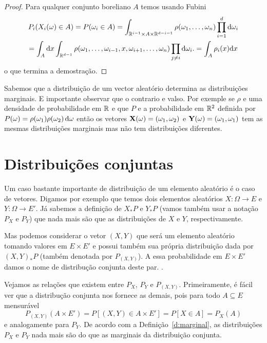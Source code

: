 \begin{proof}
 Para qualquer conjunto boreliano $A$ temos usando Fubini
 \begin{multline*}
  P_i(X_i(\omega)\in A)=P(\omega_i\in A)= \int_{{\mathbb R}^{i-1}\times A \times {\ensuremath{\mathbb R}}^{d-i-1}}
  \rho(\omega_1,\dots,\omega_n)\prod_{i=1}^d \mathrm{d} \omega_i
  \\ =\int_A  \mathrm{d} x \int_{{\mathbb R}^{d-1}}\rho(\omega_1,\dots ,\omega_{i-1},x,\omega_{i+1},\dots,\omega_n)\prod_{j\ne i} \mathrm{d} \omega_i.
  =\int_A\rho_i(x)\mathrm{d} x
 \end{multline*}
o que termina a demostração.
\end{proof}


\begin{remark}
 Sabemos que a distribuição de um vector aleatório determina as distribuições marginais.
 E importante observar que o contrario e valso. Por exemple se $\rho$ e uma densidade de probabilidade em ${\mathbb R}$ e que $P$ e
 a probabilidade em ${\mathbb R}^2$ definida por $P(\omega)=\rho(\omega_1)\rho(\omega_2)\mathop{}\!\mathrm{d} \omega$ então os vetores ${\bf X}(\omega)=(\omega_1,\omega_2)$ e ${\bf Y}(\omega)=(\omega_1,\omega_1)$
 tem as mesmas distribuições marginais mas não tem distribuições diferentes.


\end{remark}




\section{Distribuições conjuntas}

Um caso bastante importante de distribuição de um elemento aleatório é o caso de vetores.
Digamos por exemplo que temos dois elementos aleatórios $X:\Omega \to E$ e $Y:\Omega \to E'$.
Já sabemos a definição de $X_*P$ e $Y_*P$ (vamos também usar a notação $P_X$ e $P_Y$) que nada mais são que as distribuições de $X$ e $Y$, respectivamente.

Mas podemos considerar o vetor $(X, Y)$ que será um elemento aleatório tomando valores em $E \times E'$ e possui também sua própria distribuição dada por $(X, Y)_*P$ (também denotada por $P_{(X, Y)}$).
A essa probabilidade em $E \times E'$ damos o nome de distribução conjunta deste par. .

Vejamos as relações que existem entre $P_X$, $P_Y$ e $P_{(X,Y)}$.
Primeiramente, é fácil ver que a distribução conjunta nos fornece as demais, pois para todo $A \subseteq E$ mensurável
\begin{equation}
  P_{(X,Y)}(A \times E') = P[(X, Y) \in A \times E'] = P[X \in A] = P_X(A)
\end{equation}
e analogamente para $P_Y$.
De acordo com a Definição~\ref{d:marginal}, as distribuições $P_X$ e $P_Y$ nada mais são do que as marginais da distribuição conjunta.

